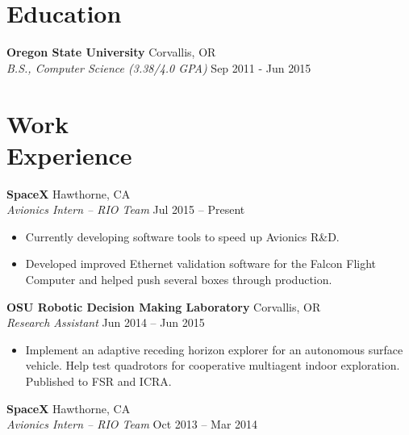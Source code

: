 \documentclass[10pt,letterpaper,margin]{res}
\newcommand{\org}[2]{{\bf #1} \hfill {\color{lightgray} #2} \\}
\newcommand{\pos}[2]{{\it #1} \hfill {\color{lightgray} #2} \vspace{0.0em}}
\begin{document}
\begin{resume}

\section{Education}

\org {Oregon State University} {Corvallis, OR}
\pos {B.S., Computer Science (3.38/4.0 GPA)} {Sep 2011 - Jun 2015}


\section{Work \\ Experience}

\org {SpaceX} {Hawthorne, CA}
\pos {Avionics Intern -- RIO Team} {Jul 2015 -- Present}

\begin{itemize}
    \item Currently developing software tools to speed up Avionics R\&D.
    \item Developed improved Ethernet validation software for the Falcon Flight
      Computer and helped push several boxes through production.
\end{itemize}


\org {OSU Robotic Decision Making Laboratory} {Corvallis, OR}
\pos {Research Assistant} {Jun 2014 -- Jun 2015}

\begin{itemize}
    \item Implement an adaptive receding horizon explorer for an autonomous
        surface vehicle. Help test quadrotors for cooperative multiagent indoor
        exploration. Published to FSR and ICRA.
\end{itemize}


\org {SpaceX} {Hawthorne, CA}
\pos {Avionics Intern -- RIO Team} {Oct 2013 -- Mar 2014}


\end{resume}
\end{document}
